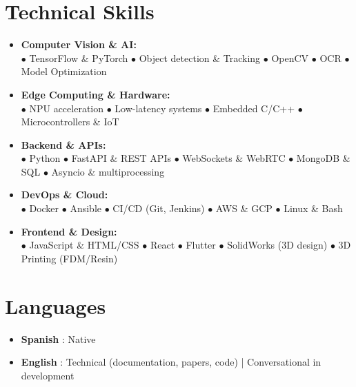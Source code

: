 \documentclass[11pt]{article}
\begin{document}
\section*{Technical Skills}
\begin{itemize}[leftmargin=0em, itemsep=0.75em, parsep=0em, label={}]

  \item{\color{headercolor}\textbf{ Computer Vision \& AI:}} \\
    \footnotesize{$\bullet$ TensorFlow \& PyTorch \quad $\bullet$ Object detection \& Tracking \quad $\bullet$ OpenCV}
    \quad
    \footnotesize{$\bullet$ OCR \quad $\bullet$ Model Optimization}

  \item{\color{headercolor}\textbf{ Edge Computing \& Hardware:}} \\
    \footnotesize{$\bullet$ NPU acceleration \quad $\bullet$ Low-latency systems}
    \quad
    \footnotesize{$\bullet$ Embedded C/C++ \quad $\bullet$ Microcontrollers \& IoT}

  \item{\color{headercolor}\textbf{ Backend \& APIs:}} \\
    \footnotesize{$\bullet$ Python \quad $\bullet$ FastAPI \& REST APIs \quad $\bullet$ WebSockets \& WebRTC}
    \quad
    \footnotesize{$\bullet$ MongoDB \& SQL \quad $\bullet$ Asyncio \& multiprocessing}

  \item{\color{headercolor}\textbf{ DevOps \& Cloud:}} \\
    \footnotesize{$\bullet$ Docker \quad $\bullet$ Ansible \quad $\bullet$ CI/CD (Git, Jenkins)}
    \quad
    \footnotesize{$\bullet$ AWS \& GCP \quad $\bullet$ Linux \& Bash}

  \item{\color{headercolor}\textbf{ Frontend \& Design:}} \\
    \footnotesize{$\bullet$ JavaScript \& HTML/CSS \quad $\bullet$ React \quad $\bullet$ Flutter}
    \quad
    \footnotesize{$\bullet$ SolidWorks (3D design) \quad $\bullet$ 3D Printing (FDM/Resin)}

\end{itemize}

\section*{Languages}
\begin{itemize}[leftmargin=0em, itemsep=0.1em, parsep=0em]

  \item[] \textbf{ Spanish }: Native

  \item[] \textbf{ English }: Technical (documentation, papers, code) | Conversational in development

\end{itemize}
\end{document}
